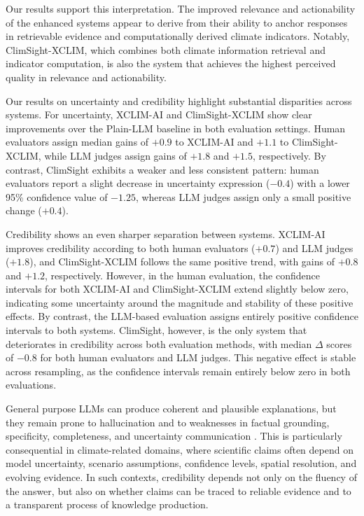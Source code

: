Our results support this interpretation. The improved relevance and actionability of the enhanced systems appear to derive from their ability to anchor responses in retrievable evidence and computationally derived climate indicators. Notably, ClimSight-XCLIM, which combines both climate information retrieval and indicator computation, is also the system that achieves the highest perceived quality in relevance and actionability.

Our results on uncertainty and credibility highlight substantial disparities across systems. For uncertainty, XCLIM-AI and ClimSight-XCLIM show clear improvements over the Plain-LLM baseline in both evaluation settings.
Human evaluators assign median gains of $+0.9$ to XCLIM-AI and $+1.1$ to ClimSight-XCLIM, while LLM judges assign gains of $+1.8$ and $+1.5$, respectively. By contrast, ClimSight exhibits a weaker and less consistent pattern: human evaluators report a slight decrease in uncertainty expression ($-0.4$) with a lower 95\% confidence value of $-1.25$, whereas LLM judges assign only a small positive change ($+0.4$).

Credibility shows an even sharper separation between systems.
XCLIM-AI improves credibility according to both human evaluators ($+0.7$) and LLM judges ($+1.8$), and ClimSight-XCLIM follows the same positive trend, with gains of $+0.8$ and $+1.2$, respectively.
However, in the human evaluation, the confidence intervals for both XCLIM-AI and ClimSight-XCLIM extend slightly below zero, indicating some uncertainty around the magnitude and stability of these positive effects.
By contrast, the LLM-based evaluation assigns entirely positive confidence intervals to both systems. ClimSight, however, is the only system that deteriorates in credibility across both evaluation methods, with median $\Delta$ scores of $-0.8$ for both human evaluators and LLM judges. This negative effect is stable across resampling, as the confidence intervals remain entirely below zero in both evaluations.

General purpose LLMs can produce coherent and plausible explanations, but they remain prone to hallucination and to weaknesses in factual grounding, specificity, completeness, and uncertainty communication \citep{ji_survey_2023, bulian_assessing_2024}.
This is particularly consequential in climate-related domains, where scientific claims often depend on model uncertainty, scenario assumptions, confidence levels, spatial resolution, and evolving evidence.
In such contexts, credibility depends not only on the fluency of the answer, but also on whether claims can be traced to reliable evidence and to a transparent process of knowledge production.

